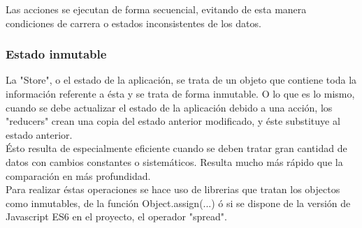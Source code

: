 Las acciones se ejecutan de forma secuencial, evitando de esta manera condiciones de carrera o estados inconsistentes de los datos. \\

\subsubsection {Estado inmutable}

La "Store", o el estado de la aplicación, se trata de un objeto que contiene toda la información referente a ésta y se trata de forma inmutable. O lo que es lo mismo, cuando se debe actualizar el estado de la aplicación debido a una acción, los "reducers" crean una copia del estado anterior modificado, y éste substituye al estado anterior. \\

Ésto resulta de especialmente eficiente cuando se deben tratar gran cantidad de datos con cambios constantes o sistemáticos. Resulta mucho más rápido que la comparación en más profundidad. \\

Para realizar éstas operaciones se hace uso de librerias que tratan los objectos como inmutables, de la función Object.assign(...) ó si se dispone de la versión de Javascript ES6 en el proyecto, el operador "spread". \\

